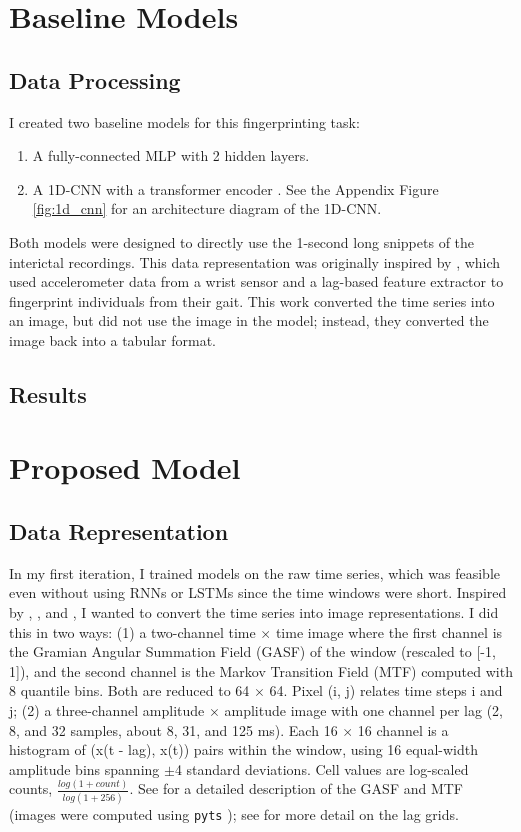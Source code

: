 \documentclass{article}
\begin{document}
\section{Baseline Models}
\subsection{Data Processing}
I created two baseline models for this fingerprinting task:
\begin{enumerate}
    \item A fully-connected MLP with 2 hidden layers.
    \item A 1D-CNN with a transformer encoder \parencite{hong_holmes_2020}. See the Appendix Figure \ref{fig:1d_cnn} for an architecture diagram of the 1D-CNN.
\end{enumerate}

Both models were designed to directly use the 1-second long snippets of the interictal recordings. This data representation was originally inspired by \textcite{koffman_fingerprinting_2023}, which used accelerometer data from a wrist sensor and a lag-based feature extractor to fingerprint individuals from their gait. This work converted the time series into an image, but did not use the image in the model; instead, they converted the image back into a tabular format.

\subsection{Results}


\section{Proposed Model}
\subsection{Data Representation}
In my first iteration, I trained models on the raw time series, which was feasible even without using RNNs or LSTMs since the time windows were short. Inspired by \textcite{koffman_fingerprinting_2023}, \textcite{wang_encoding_2015}, and \textcite{yang_sensor_2019}, I wanted to convert the time series into image representations.
I did this in two ways: (1) a two-channel time $\times$ time image where the first channel is the Gramian Angular
Summation Field (GASF) of the window (rescaled to [-1, 1]), and the second channel is the Markov Transition
Field (MTF) computed with 8 quantile bins. Both are reduced to 64 $\times$ 64. Pixel (i, j) relates time steps i and j;
(2) a three-channel amplitude $\times$ amplitude image with one channel per lag (2, 8, and 32 samples, about 8, 31, and 125 ms). Each 16 $\times$ 16 channel is a histogram of (x(t - lag), x(t)) pairs within the window, using 16 equal-width amplitude bins spanning $\pm$4 standard deviations. Cell values are log-scaled counts, $\frac{log(1 + count)}{log(1 + 256)}$. See \textcite{wang_encoding_2015} for a detailed description of the GASF and MTF (images were computed using \texttt{pyts} \parencite{faouzi_pyts_2020}); see \textcite{koffman_fingerprinting_2023} for more detail on the lag grids.
\end{document}
